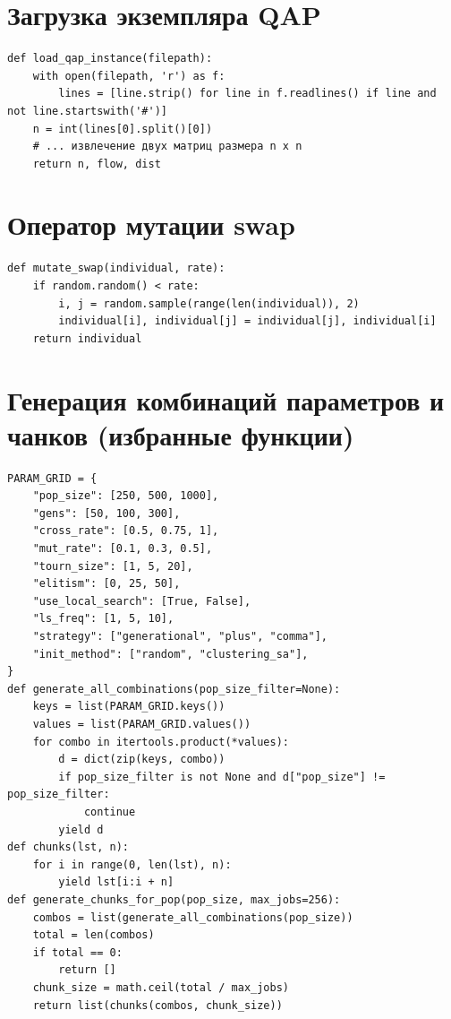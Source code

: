 \documentclass[732]{studrep}
\theoremstyle{nonumberplain}
\begin{document}
\section{Загрузка экземпляра QAP}
\begin{listing}[H]
\begin{verbatim}
def load_qap_instance(filepath):
    with open(filepath, 'r') as f:
        lines = [line.strip() for line in f.readlines() if line and not line.startswith('#')]
    n = int(lines[0].split()[0])
    # ... извлечение двух матриц размера n x n
    return n, flow, dist
\end{verbatim}
\caption{Загрузка экземпляра QAP.}
\label{lst:load}
\end{listing}

\section{Оператор мутации swap}
\begin{listing}[H]
\begin{verbatim}
def mutate_swap(individual, rate):
    if random.random() < rate:
        i, j = random.sample(range(len(individual)), 2)
        individual[i], individual[j] = individual[j], individual[i]
    return individual
\end{verbatim}
\caption{Оператор мутации swap.}
\label{lst:mut}
\end{listing}

\section{Генерация комбинаций параметров и чанков (избранные функции)}
\begin{listing}[H]
\begin{verbatim}
PARAM_GRID = {
    "pop_size": [250, 500, 1000],
    "gens": [50, 100, 300],
    "cross_rate": [0.5, 0.75, 1],
    "mut_rate": [0.1, 0.3, 0.5],
    "tourn_size": [1, 5, 20],
    "elitism": [0, 25, 50],
    "use_local_search": [True, False],
    "ls_freq": [1, 5, 10],
    "strategy": ["generational", "plus", "comma"],
    "init_method": ["random", "clustering_sa"],
}
def generate_all_combinations(pop_size_filter=None):
    keys = list(PARAM_GRID.keys())
    values = list(PARAM_GRID.values())
    for combo in itertools.product(*values):
        d = dict(zip(keys, combo))
        if pop_size_filter is not None and d["pop_size"] != pop_size_filter:
            continue
        yield d
def chunks(lst, n):
    for i in range(0, len(lst), n):
        yield lst[i:i + n]
def generate_chunks_for_pop(pop_size, max_jobs=256):
    combos = list(generate_all_combinations(pop_size))
    total = len(combos)
    if total == 0:
        return []
    chunk_size = math.ceil(total / max_jobs)
    return list(chunks(combos, chunk_size))
\end{verbatim}
\caption{Ключевые функции генератора комбинаций и чанков (\texttt{generate\_chunks.py}).}
\label{lst:gen_chunks}
\end{listing}
\end{document}
